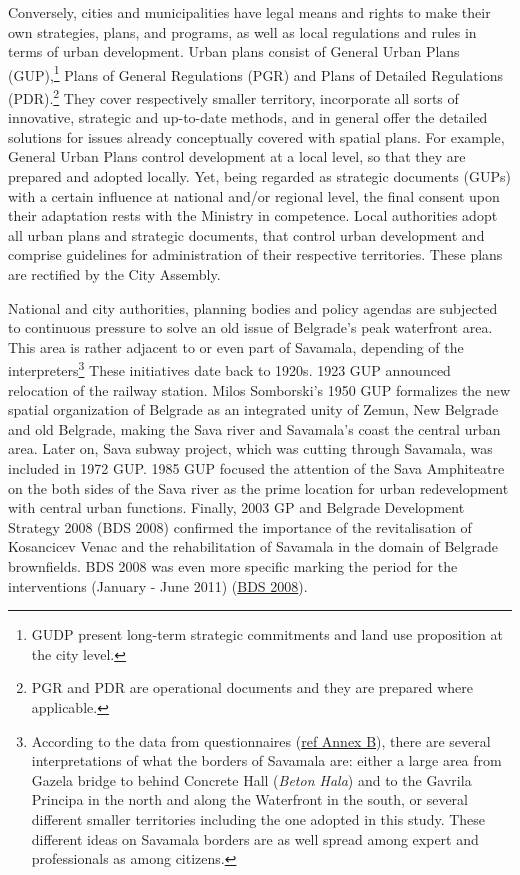 \documentclass[11pt]{report}
\begin{document}
\begin{itemize}
Conversely, cities and municipalities have legal means and rights to make their own strategies, plans, and programs, as well as local regulations and rules in terms of urban development.
Urban plans consist of General Urban Plans (GUP),\footnote{GUDP present long-term strategic commitments and land use proposition at the city level.} Plans of General Regulations (PGR) and Plans of Detailed Regulations (PDR).\footnote{PGR and PDR are operational documents and they are prepared where applicable.}
They cover respectively smaller territory, incorporate all sorts of innovative, strategic and up-to-date methods, and in general offer the detailed solutions for issues already conceptually covered with spatial plans.
For example, General Urban Plans control development at a local level, so that they are prepared and adopted locally.
Yet, being regarded as strategic documents (GUPs) with a certain influence at national and/or regional level, the final consent upon their adaptation rests with the Ministry in competence.
Local authorities adopt all urban plans and strategic documents, that control urban development and comprise guidelines for administration of their respective territories.
These plans are rectified by the City Assembly.

National and city authorities, planning bodies and policy agendas are subjected to continuous pressure to solve an old issue of Belgrade’s peak waterfront area.
This area is rather adjacent to or even part of Savamala, depending of the interpreters\footnote{According to the data from questionnaires (\href{}{ref Annex B}), there are several interpretations of what the borders of Savamala are: either a large area from Gazela bridge to behind Concrete Hall (\textit{Beton Hala}) and to the Gavrila Principa in the north and along the Waterfront in the south, or several different smaller territories including the one adopted in this study. These different ideas on Savamala borders are as well spread among expert and professionals as among citizens.}
These initiatives date back to 1920s.
1923 GUP announced relocation of the railway station.
Milos Somborski's 1950 GUP formalizes the new spatial organization of Belgrade as an integrated unity of Zemun, New Belgrade and old Belgrade, making the Sava river and Savamala's coast the central urban area.
Later on, Sava subway project, which was cutting through Savamala, was included in 1972 GUP.
1985 GUP focused the attention of the Sava Amphiteatre on the both sides of the Sava river as the prime location for urban redevelopment with central urban functions.
Finally, 2003 GP and Belgrade Development Strategy 2008 (BDS 2008) confirmed the importance of the revitalisation of Kosancicev Venac and the rehabilitation of Savamala in the domain of Belgrade brownfields. BDS 2008 was even more specific marking the period for the interventions (January - June 2011) (\href{}{BDS 2008}).
\\


\end{itemize}
\end{document}
